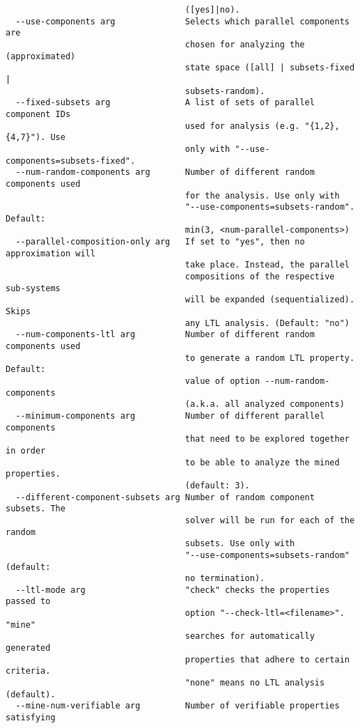 \documentclass[natbib]{article}
\begin{document}
\begin{verbatim}
                                    ([yes]|no).
  --use-components arg              Selects which parallel components are 
                                    chosen for analyzing the (approximated) 
                                    state space ([all] | subsets-fixed | 
                                    subsets-random).
  --fixed-subsets arg               A list of sets of parallel component IDs 
                                    used for analysis (e.g. "{1,2},{4,7}"). Use
                                    only with "--use-components=subsets-fixed".
  --num-random-components arg       Number of different random components used 
                                    for the analysis. Use only with 
                                    "--use-components=subsets-random". Default:
                                    min(3, <num-parallel-components>)
  --parallel-composition-only arg   If set to "yes", then no approximation will
                                    take place. Instead, the parallel 
                                    compositions of the respective sub-systems 
                                    will be expanded (sequentialized). Skips 
                                    any LTL analysis. (Default: "no")
  --num-components-ltl arg          Number of different random components used 
                                    to generate a random LTL property. Default:
                                    value of option --num-random-components 
                                    (a.k.a. all analyzed components)
  --minimum-components arg          Number of different parallel components 
                                    that need to be explored together in order 
                                    to be able to analyze the mined properties.
                                    (default: 3).
  --different-component-subsets arg Number of random component subsets. The 
                                    solver will be run for each of the random 
                                    subsets. Use only with 
                                    "--use-components=subsets-random" (default:
                                    no termination).
  --ltl-mode arg                    "check" checks the properties passed to 
                                    option "--check-ltl=<filename>". "mine" 
                                    searches for automatically generated 
                                    properties that adhere to certain criteria.
                                    "none" means no LTL analysis (default).
  --mine-num-verifiable arg         Number of verifiable properties satisfying 

\end{verbatim}
\end{document}
